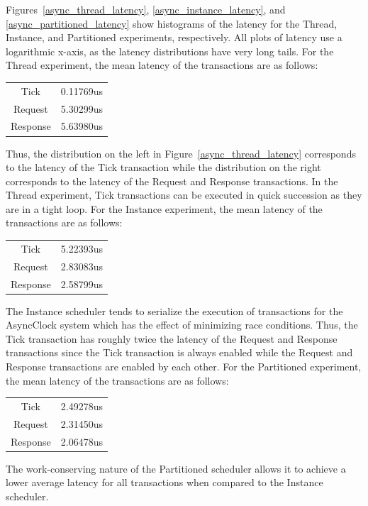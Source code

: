 Figures~\ref{async_thread_latency}, \ref{async_instance_latency}, and \ref{async_partitioned_latency} show histograms of the latency for the Thread, Instance, and Partitioned experiments, respectively.
All plots of latency use a logarithmic x-axis, as the latency distributions have very long tails.
For the Thread experiment, the mean latency of the transactions are as follows:
\begin{center}
\begin{tabular}{cr}
Tick     & 0.11769us \\
Request  & 5.30299us \\
Response & 5.63980us \\
\end{tabular}
\end{center}
Thus, the distribution on the left in Figure~\ref{async_thread_latency} corresponds to the latency of the Tick transaction while the distribution on the right corresponds to the latency of the Request and Response transactions.
In the Thread experiment, Tick transactions can be executed in quick succession as they are in a tight loop.
For the Instance experiment, the mean latency of the transactions are as follows:
\begin{center}
\begin{tabular}{cr}
Tick     & 5.22393us \\
Request  & 2.83083us \\
Response & 2.58799us \\
\end{tabular}
\end{center}
The Instance scheduler tends to serialize the execution of transactions for the AsyncClock system which has the effect of minimizing race conditions.
Thus, the Tick transaction has roughly twice the latency of the Request and Response transactions since the Tick transaction is always enabled while the Request and Response transactions are enabled by each other.
For the Partitioned experiment, the mean latency of the transactions are as follows:
\begin{center}
\begin{tabular}{cr}
Tick     & 2.49278us \\
Request  & 2.31450us \\
Response & 2.06478us \\
\end{tabular}
\end{center}
The work-conserving nature of the Partitioned scheduler allows it to achieve a lower average latency for all transactions when compared to the Instance scheduler.


